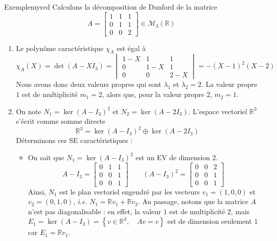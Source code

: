     \begin{omed}{Exemple}{myred}
        Calculons la décomposition de Dunford de la matrice 
        \[ A = \begin{bmatrix}
            1 & 1 & 1 \\
            0 & 1 & 1 \\
            0 & 0 & 2
        \end{bmatrix} \in \mathcal{M}_3(\mathbb{R}) \]   
        \begin{enumerate}
            \item Le polynôme caractéristique $\chi_A$ est égal à 
            \[ \chi_A(X) = \det(A - X I_3) = \begin{vmatrix}
                1 - X & 1 & 1 \\
                0 & 1- X & 1 \\
                0 & 0 & 2- X
            \end{vmatrix} = -(X-1)^2(X-2) \]   
            Nous avons donc deux valeurs propres qui sont $\lambda_1$ et $\lambda_2 = 2$. La valeur propre $1$ est de multiplicité $m_1 = 2$, alors que, pour la valeur propre 2, $m_2 = 1$.
            \item On note $N_1 = \ker(A - I_3)^2$ et $N_2 = \ker(A - 2 I_3)$. L’espace vectoriel $\mathbb{R}^3$ s’écrit comme somme directe 
            \[ \mathbb{R}^3 = \ker(A - I_3)^2 \oplus \ker(A - 2 I_3) \]    
            Déterminons ces SE caractéristiques : 
            \begin{itemize}
                \item On sait que $N_1 = \ker(A - I_3)^2$ est un EV de dimension $2$. 
                \[ A - I_3 = \begin{bmatrix}
                    0 & 1 & 1 \\
                    0 & 0 & 1 \\
                    0 & 0 & 1
                \end{bmatrix} \qquad (A - I_3)^2 = \begin{bmatrix}
                    0 & 0 & 2 \\
                    0 & 0 & 1 \\
                    0 & 0 & 1
                \end{bmatrix} \]   
                Ainsi, $N_1$ est le plan vectoriel engendré par les vecteurs $v_1 = (1,0,0)$ et $v_2 = (0,1,0)$, \textit{i.e.} $N_1 = \mathbb{R} v_1 + \mathbb{R} v_2$. Au passage, notons que la matrice $A$ n’est pas diagonalisable : en effet, la valeur $1$ est de multiplicité $2$, mais $E_1 = \ker(A - I_3) = \left\{v \in \mathbb{R}^3, \quad Av = v\right\}$ est de dimension seulement $1$ car $E_1 = \mathbb{R} v_1$.

\end{itemize}
\end{enumerate}
\end{omed}
